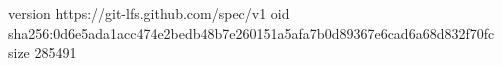 version https://git-lfs.github.com/spec/v1
oid sha256:0d6e5ada1acc474e2bedb48b7e260151a5afa7b0d89367e6cad6a68d832f70fc
size 285491
